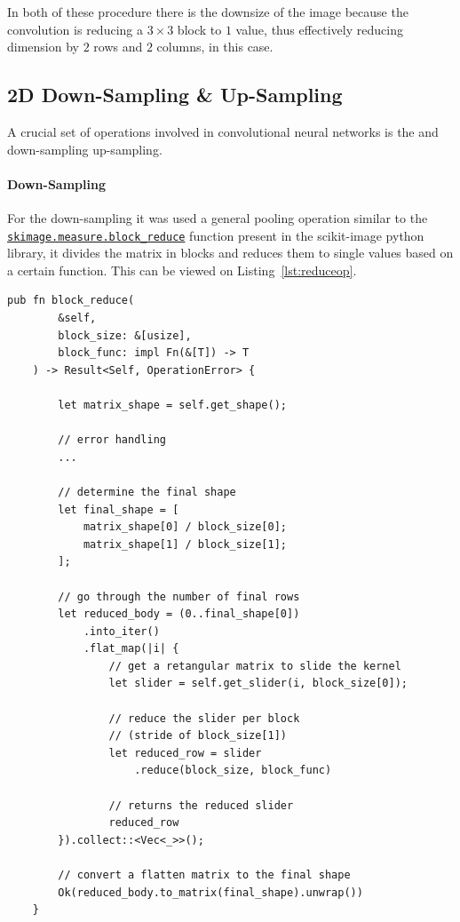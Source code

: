In both of these procedure there is the downsize of the image because the convolution is reducing a $ 3 \times 3 $ block to $ 1 $ value, thus effectively reducing dimension by $ 2 $ rows and $ 2 $ columns, in this case.

\subsection{2D Down-Sampling \& Up-Sampling}

A crucial set of operations involved in convolutional neural networks is the and down-sampling up-sampling.

\paragraph{Down-Sampling}
For the down-sampling it was used a general pooling operation similar to the \href{https://scikit-image.org/docs/stable/api/skimage.measure.html#skimage.measure.block_reduce}{\texttt{skimage.measure.block\_reduce}} function present in the scikit-image \parencite{van2014scikit} python library, it divides the matrix in blocks and reduces them to single values based on a certain function. This can be viewed on Listing~\ref{lst:reduceop}.

\begin{lstlisting}[label=lst:reduceop,caption=Overview on the Reduce operation on images implemented in the Renplex library using Rust.]
	pub fn block_reduce(
		&self, 
		block_size: &[usize], 
		block_func: impl Fn(&[T]) -> T
	) -> Result<Self, OperationError> {
		
		let matrix_shape = self.get_shape();
		
		// error handling
		...
		
		// determine the final shape
		let final_shape = [
			matrix_shape[0] / block_size[0];
			matrix_shape[1] / block_size[1];
		];
		
		// go through the number of final rows
		let reduced_body = (0..final_shape[0])
			.into_iter()
			.flat_map(|i| {
				// get a retangular matrix to slide the kernel
				let slider = self.get_slider(i, block_size[0]);
			
				// reduce the slider per block 
				// (stride of block_size[1])
				let reduced_row = slider
					.reduce(block_size, block_func)
			
				// returns the reduced slider
				reduced_row
		}).collect::<Vec<_>>();
		
		// convert a flatten matrix to the final shape
		Ok(reduced_body.to_matrix(final_shape).unwrap())
	}
\end{lstlisting}

